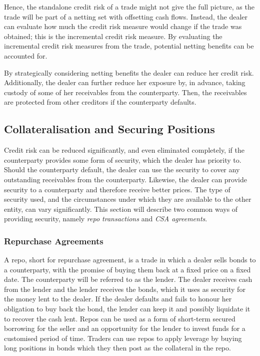 \documentclass[main.tex]{subfiles}
\begin{document}
        Hence, the standalone credit risk of a trade might not give the full picture,
        as the trade will be part of a netting set with offsetting cash flows.
        Instead, the dealer can evaluate how much the credit risk measure
        would change if the trade was obtained; this is the incremental credit risk measure.
        By evaluating the incremental credit risk measures from the trade,
        potential netting benefits can be accounted for. 

        By strategically considering netting benefits the dealer can reduce her credit risk. 
        Additionally, the dealer can further reduce her exposure by, in advance,
        taking custody of some of her receivables from the counterparty.
        Then, the receivables are protected from other creditors if the counterparty defaults.

    \subsection{Collateralisation and Securing Positions}
        Credit risk can be reduced significantly, and even eliminated completely,
        if the counterparty provides some form of security, which the dealer has priority to.
        Should the counterparty default, the dealer can use the security to cover any
        outstanding receivables from the counterparty. 
        Likewise, the dealer can provide security to a counterparty and 
        therefore receive better prices.
        The type of security used, and the circumstances 
        under which they are available to the other entity, can vary significantly.
        This section will describe two common ways of providing security, 
        namely \textit{repo transactions} and \textit{CSA agreements}.

        \subsubsection{Repurchase Agreements}
        A repo, short for repurchase agreement, is a trade in which a dealer 
        sells bonds to a counterparty,
        with the promise of buying them back at a fixed price on a fixed date.
        The counterparty will be referred to as the lender.
        The dealer receives cash from the lender and the lender receives the bonds,
        which it uses as security for the money lent to the dealer. 
        If the dealer defaults and fails to honour her obligation to buy back the bond,
        the lender can keep it and possibly liquidate it to recover the cash lent. 
        Repos can be used as a form of short-term secured borrowing for the seller
        and an opportunity for the lender to invest funds for a customised period of time. 
        Traders can use repos to apply leverage by buying long positions in bonds 
        which they then post as the collateral in the repo. 
\end{document}

